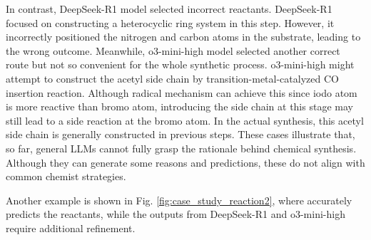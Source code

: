In contrast, DeepSeek-R1 \cite{deepseekai2025r1} model selected incorrect reactants. DeepSeek-R1 focused on constructing a heterocyclic ring system in this step. However, it incorrectly positioned the nitrogen and carbon atoms in the substrate, leading to the wrong outcome. Meanwhile, o3-mini-high model selected another correct route but not so convenient for the whole synthetic process. o3-mini-high might attempt to construct the acetyl side chain by transition-metal-catalyzed CO insertion reaction. Although radical mechanism can achieve this since iodo atom is more reactive than bromo atom, introducing the side chain at this stage may still lead to a side reaction at the bromo atom. In the actual synthesis, this acetyl side chain is generally constructed in previous steps. These cases illustrate that, so far, general LLMs cannot fully grasp the rationale behind chemical synthesis. Although they can generate some reasons and predictions, these do not align with common chemist strategies.



Another example is shown in Fig. \ref{fig:case_study_reaction2}, where \ourM{} accurately predicts the reactants, while the outputs from DeepSeek-R1 and o3-mini-high require additional refinement.